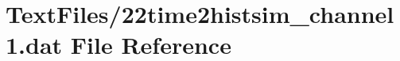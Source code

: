 \hypertarget{22time2histsim__channel1_8dat}{}\section{Text\+Files/22time2histsim\+\_\+channel1.dat File Reference}
\label{22time2histsim__channel1_8dat}
